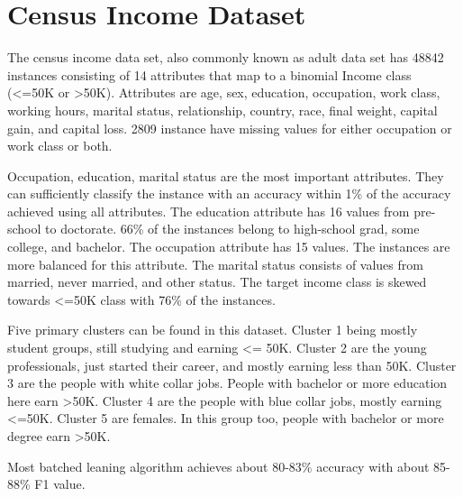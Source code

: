 \chapter{Census Income Dataset}
\label{appndx:ci}

The census income data set, also commonly known as adult data set has 48842 instances consisting of 14 attributes that map to a binomial Income class (<=50K or >50K). Attributes are age, sex, education, occupation, work class, working hours, marital status, relationship, country, race, final weight, capital gain, and capital loss. 2809 instance have missing values for either occupation or work class or both.

Occupation, education, marital status are the most important attributes. They can sufficiently classify the instance with an accuracy within 1\% of the accuracy achieved using all attributes. The education attribute has 16 values from pre-school to doctorate. 66\% of the instances belong to high-school grad, some college, and bachelor. The occupation attribute has 15 values. The instances are  more balanced for this attribute. The marital status consists of values from married, never married, and other status. The target income class is skewed towards <=50K class with 76\% of the instances.

Five primary clusters can be found in this dataset. Cluster 1 being mostly student groups, still studying and earning <= 50K. Cluster 2 are the young professionals, just started their career, and mostly earning less than 50K. Cluster 3 are the people with white collar jobs. People with bachelor or more education here earn >50K. Cluster 4 are the people with blue collar jobs, mostly earning <=50K. Cluster 5 are females. In this group too, people with bachelor or more degree earn >50K.

Most batched leaning algorithm achieves about 80-83\% accuracy with about 85-88\% F1 value.